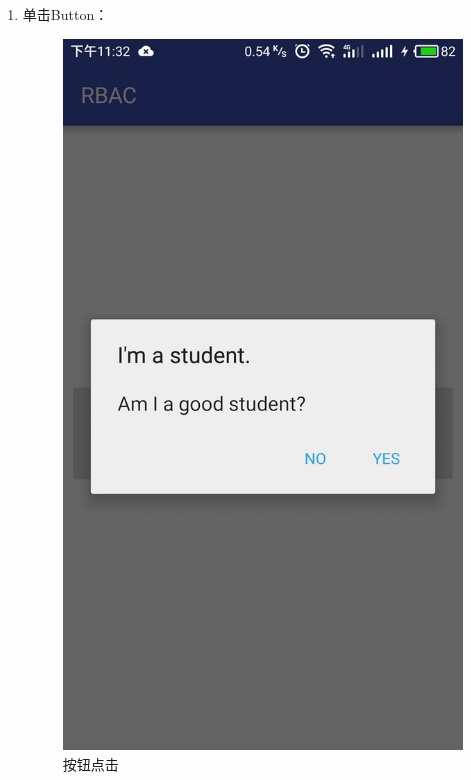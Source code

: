 \begin{itemize}
\begin{enumerate}
\begin{itemize}
\begin{enumerate}
				\item 单击Button：
				\begin{figure}[H]
					\centering
					\includegraphics[height=0.39\textheight]{snapshot/10}
					\caption{按钮点击}
					\label{fig:10}
				\end{figure}
			

\end{enumerate}
\end{itemize}
\end{enumerate}
\end{itemize}

